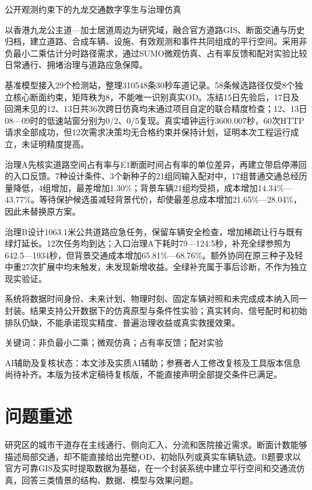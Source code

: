 \documentclass[UTF8,fontset=windows,zihao=-4,a4paper]{ctexart}
\begin{document}
\begin{center}
{\heiti{}公开观测约束下的九龙交通数字孪生与治理仿真}\par
\vspace{.6em}{\heiti 摘\quad 要}
\end{center}
以香港九龙公主道—加士居道周边为研究域，融合官方道路GIS、断面交通与历史归档，建立道路、合成车辆、设施、有效观测和事件共同组成的平行空间。采用非负最小二乘估计分时路径需求，通过SUMO微观仿真、占有率反馈和配对实验比较日常通行、拥堵治理与道路应急保障。

基准模型接入29个检测站，整理310548条30秒车道记录。58条候选路径仅受8个独立核心断面约束，矩阵秩为8，不能唯一识别真实OD。冻结15日先验后，17日及回溯未见的12、13日共36次跨日仿真均未通过项目自定的联合精度检查；12、13日08—09时的低速站窗分别为0/2、0/5复现。真实墙钟运行3600.007秒，60次HTTP请求全部成功，但12次需求决策均无合格约束并保持计划，证明本次工程运行成立，未证明精度提高。

治理A先核实道路空间占有率与E1断面时间占有率的单位差异，再建立带启停滞回的入口反馈。7种设计条件、3个新种子的21组同输入配对中，17组普通交通总经历量降低，4组增加，最差增加1.30\%；背景车辆21组均受损，成本增加14.34\%—43.77\%。等待保护候选虽减轻背景代价，却使最差总成本增加21.65\%—28.04\%，因此未替换原方案。

治理B设计1063.1米公共道路应急任务，保留车辆安全检查，增加稀疏让行与既有绿灯延长。12次任务均到达；入口治理A下耗时79—124.5秒，补充全绿参照为642.5—1934秒，但背景交通成本增加65.81\%—68.76\%。额外协同在原三种子及轻中重27次扩展中均未触发，未发现新增收益。全绿补充属于事后诊断，不作为独立现实验证。

系统将数据时间身份、未来计划、物理时刻、固定车辆对照和未完成成本纳入同一封装。结果支持公开数据下的仿真原型与条件性实验；真实转向、信号配时和初始排队仍缺，不能承诺现实精度、普遍治理收益或真实救援效果。

\noindent 关键词：非负最小二乘；微观仿真；占有率反馈；配对实验

\vspace{.5em}\noindent AI辅助及复核状态：本文涉及实质AI辅助；参赛者人工修改复核及工具版本信息尚待补齐。本版为技术定稿待复核版，不能直接声明全部提交条件已满足。
\newpage
\tableofcontents
\newpage
\section{问题重述}
研究区的城市干道存在主线通行、侧向汇入、分流和医院接近需求。断面计数能够描述局部交通，却不能直接给出完整OD、初始队列或真实车辆轨迹。B题要求以官方可靠GIS及实时提取数据为基础，在一个封装系统中建立平行空间和交通流仿真，回答三类情景的结构、数据、模型与效果问题。
\end{document}

